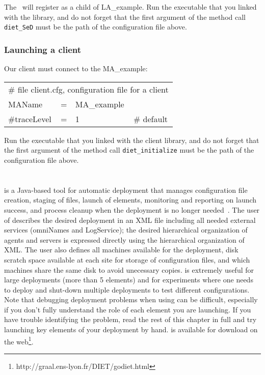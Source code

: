 The \sed\ will register as a child of LA\_example. Run the executable that you
linked with the \diet \sed library, and do not forget that the first argument
of the method call \texttt{diet\_SeD} must be the path of the configuration
file above.


\subsubsection{Launching a client}

Our client must connect to the MA\_example:
\tt
\begin{center}
 \footnotesize
 \begin{tabular}{lcll}
  \multicolumn{4}{l}{\# file client.cfg, configuration file for a client}\\
  MAName       &=&MA\_example        &\\
  \#traceLevel &=&1                 &\# default\\
 \end{tabular}
\end{center}
\rm

Run the executable that you linked with the \diet client library, and do not
forget that the first argument of the method call \texttt{diet\_initialize}
must be the path of the configuration file above.

\section{\godiet}
\label{sec:deployGoDIET}

\godiet is a Java-based tool for automatic \diet deployment that manages
configuration file creation, staging of files, launch of elements, monitoring
and reporting on launch success, and process cleanup when the \diet deployment
is no longer needed~\cite{CDa05}. The user of \godiet describes the desired
deployment in an XML file including all needed external services (\eg omniNames
and LogService); the desired hierarchical organization of agents and servers is
expressed directly using the hierarchical organization of XML. The user also
defines all machines available for the deployment, disk scratch space available
at each site for storage of configuration files, and which machines share the
same disk to avoid unecessary copies. \godiet is extremely useful for large
deployments (\eg more than 5 elements) and for experiments where one needs to
deploy and shut-down multiple deployments to test different
configurations. Note that debugging deployment problems when using \godiet can
be difficult, especially if you don't fully understand the role of each element
you are launching. If you have trouble identifying the problem, read the rest
of this chapter in full and try launching key elements of your deployment by
hand. \godiet is available for download on the
web\footnote{http://graal.ens-lyon.fr/DIET/godiet.html}.

